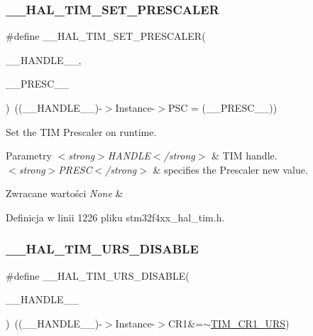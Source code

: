 \subsubsection{\texorpdfstring{\+\_\+\+\_\+\+H\+A\+L\+\_\+\+T\+I\+M\+\_\+\+S\+E\+T\+\_\+\+P\+R\+E\+S\+C\+A\+L\+ER}{\_\_HAL\_TIM\_SET\_PRESCALER}}
{\footnotesize\ttfamily \#define \+\_\+\+\_\+\+H\+A\+L\+\_\+\+T\+I\+M\+\_\+\+S\+E\+T\+\_\+\+P\+R\+E\+S\+C\+A\+L\+ER(\begin{DoxyParamCaption}\item[{}]{\+\_\+\+\_\+\+H\+A\+N\+D\+L\+E\+\_\+\+\_\+,  }\item[{}]{\+\_\+\+\_\+\+P\+R\+E\+S\+C\+\_\+\+\_\+ }\end{DoxyParamCaption})~((\+\_\+\+\_\+\+H\+A\+N\+D\+L\+E\+\_\+\+\_\+)-\/$>$Instance-\/$>$P\+SC = (\+\_\+\+\_\+\+P\+R\+E\+S\+C\+\_\+\+\_\+))}



Set the T\+IM Prescaler on runtime. 


\begin{DoxyParams}{Parametry}
{\em $<$strong$>$\+H\+A\+N\+D\+L\+E$<$/strong$>$} & T\+IM handle. \\
\hline
{\em $<$strong$>$\+P\+R\+E\+S\+C$<$/strong$>$} & specifies the Prescaler new value. \\
\hline
\end{DoxyParams}

\begin{DoxyRetVals}{Zwracane wartości}
{\em None} & \\
\hline
\end{DoxyRetVals}


Definicja w linii 1226 pliku stm32f4xx\+\_\+hal\+\_\+tim.\+h.

\mbox{\label{group___t_i_m___exported___macros_gafacb551a4c537e62a0fe740b2f12236c}} 
\subsubsection{\texorpdfstring{\+\_\+\+\_\+\+H\+A\+L\+\_\+\+T\+I\+M\+\_\+\+U\+R\+S\+\_\+\+D\+I\+S\+A\+B\+LE}{\_\_HAL\_TIM\_URS\_DISABLE}}
{\footnotesize\ttfamily \#define \+\_\+\+\_\+\+H\+A\+L\+\_\+\+T\+I\+M\+\_\+\+U\+R\+S\+\_\+\+D\+I\+S\+A\+B\+LE(\begin{DoxyParamCaption}\item[{}]{\+\_\+\+\_\+\+H\+A\+N\+D\+L\+E\+\_\+\+\_\+ }\end{DoxyParamCaption})~((\+\_\+\+\_\+\+H\+A\+N\+D\+L\+E\+\_\+\+\_\+)-\/$>$Instance-\/$>$C\+R1\&=$\sim$\hyperlink{group___peripheral___registers___bits___definition_ga06c997c2c23e8bef7ca07579762c113b}{T\+I\+M\+\_\+\+C\+R1\+\_\+\+U\+RS})}



